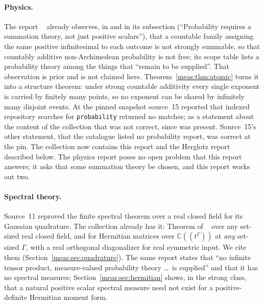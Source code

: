\documentclass[11pt]{article}
\numberwithin{equation}{section}
\theoremstyle{definition}
\theoremstyle{remark}
\newcommand{\C}{\mathbb C}
\begin{document}
\paragraph{Physics.} The report
~\cite{repophys} already
observes, in  and in its subsection
 (``Probability requires a summation theory, not
just positive scalars''), that a countable family assigning the same positive
infinitesimal to each outcome is not strongly summable, so that countably
additive non-Archimedean probability is not free; its scope table lists a
probability theory among the things that ``remain to be supplied''. That
observation is prior and is not claimed here. Theorem~\ref{meas:thm:atomic}
turns it into a structure theorem: under strong countable additivity every
single exponent is carried by finitely many points, so no exponent can be
shared by infinitely many disjoint events. At the pinned snapshot source~15 reported that indexed
repository searches for \texttt{probability} returned no matches; as a
statement about the content of the collection that was not correct, since
 was present. Source~15's other statement, that
the catalogue listed no probability report, was correct at the pin. The
collection now contains this report and the Herglotz report described below.
The physics report poses no open problem that this report answers; it asks
that some summation theory be chosen, and this report works out two.

\paragraph{Spectral theory.} Source~11 reproved the finite spectral theorem
over a real closed field for its Gaussian quadrature. The collection already
has it: Theorem  of
~\cite{repospec} over any set-sized real
closed field, and  for Hermitian matrices over
$\C((t^\Gamma))$ at \emph{any} set-sized $\Gamma$, with a real orthogonal
diagonalizer for real symmetric input. We cite them
(Section~\ref{meas:sec:quadrature}). The same report states that ``no
infinite tensor product, measure-valued probability theory \ldots\ is
supplied'' and that it has no spectral measures; Section~\ref{meas:sec:hermitian}
shows, in the strong class, that a natural positive scalar spectral measure
need not exist for a positive-definite Hermitian moment form.
\end{document}
